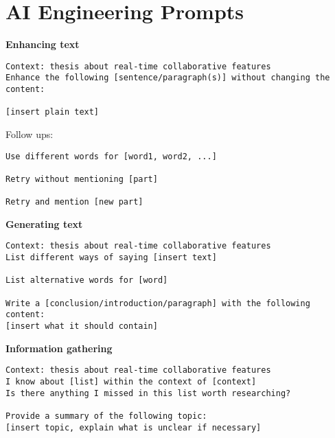 \newpage

\section*{AI Engineering Prompts}

\textbf{Enhancing text}

\begin{verbatim}
Context: thesis about real-time collaborative features
Enhance the following [sentence/paragraph(s)] without changing the content:

[insert plain text]
\end{verbatim}

Follow ups:

\begin{verbatim}
Use different words for [word1, word2, ...]

Retry without mentioning [part]

Retry and mention [new part]
\end{verbatim}

\textbf{Generating text}

\begin{verbatim}
Context: thesis about real-time collaborative features
List different ways of saying [insert text]

List alternative words for [word]

Write a [conclusion/introduction/paragraph] with the following content:
[insert what it should contain]
\end{verbatim}

\textbf{Information gathering}

\begin{verbatim}
Context: thesis about real-time collaborative features
I know about [list] within the context of [context]
Is there anything I missed in this list worth researching?

Provide a summary of the following topic:
[insert topic, explain what is unclear if necessary]
\end{verbatim}
